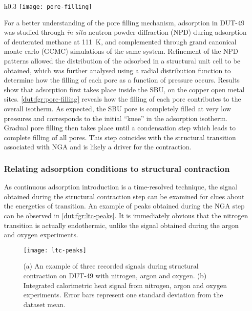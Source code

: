 \begin{wrapfigure}{h}{0.3\textwidth}
	\centering
	\texttt{[image: pore-filling]}%
    \caption{A dissection of the  isotherm
    at \SI{111}{\kelvin} 
    in components of adsorption in each type of pore.}%
	\label{dut:fgr:pore-filling}
\end{wrapfigure}
For a better understanding of the pore filling mechanism, adsorption
in DUT-49 was studied through \textit{in situ} neutron powder diffraction
(NPD) during adsorption of deuterated methane  at \SI{111}{\kelvin},
and complemented through grand canonical monte carlo (GCMC) simulations
of the same system. Refinement of the NPD patterns allowed the distribution
of the adsorbed  in a structural unit cell to be obtained, which
was further analysed using a radial distribution function to determine
how the filling of each pore as a function of pressure occurs. 
Results show that adsorption first takes place inside the SBU,
on the copper open metal sites. 
\autoref{dut:fgr:pore-filling} reveals how
the filling of each pore contributes to the overall isotherm.
As expected, the SBU pore is completely filled at very low pressures
and corresponds to the initial ``knee'' in the adsorption isotherm. Gradual
pore filling then takes place until a condensation step which 
leads to complete filling of all pores. This step coincides with 
the structural transition associated with NGA and is likely a driver 
for the contraction.

\subsubsection{Relating adsorption conditions to structural contraction}

As continuous adsorption introduction is a time-resolved technique, 
the signal obtained during the structural contraction step can 
be examined for clues about the energetics of transition. An example 
of peaks obtained during the NGA step can be observed in 
\autoref{dut:fgr:ltc-peaks}. It is immediately obvious that 
the nitrogen transition is actually endothermic, unlike the 
signal obtained during the argon and oxygen experiments.

\begin{figure}[htb]
    \centering
    \texttt{[image: ltc-peaks]}%
    \caption{(a) An example of three recorded signals during 
    structural contraction on DUT-49 with nitrogen, argon and 
    oxygen. (b) Integrated calorimetric heat signal from 
    nitrogen, argon and oxygen experiments. Error bars 
    represent one standard deviation from the dataset mean.}%
    \label{dut:fgr:ltc-peaks}
\end{figure}

